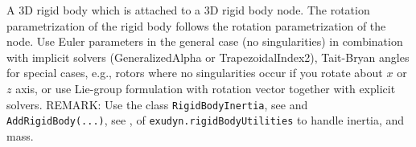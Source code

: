 
\label{sec:item:ObjectRigidBody}
A 3D rigid body which is attached to a 3D rigid body node. The rotation parametrization of the rigid body follows the rotation parametrization of the node. Use Euler parameters in the general case (no singularities) in combination with implicit solvers (GeneralizedAlpha or TrapezoidalIndex2), Tait-Bryan angles for special cases, e.g., rotors where no singularities occur if you rotate about $x$ or $z$ axis, or use Lie-group formulation with rotation vector together with explicit solvers. REMARK: Use the class \texttt{RigidBodyInertia}, see  and \texttt{AddRigidBody(...)}, see , of \texttt{exudyn.rigidBodyUtilities} to handle inertia,  and mass. 
\vspace{12pt}\\

